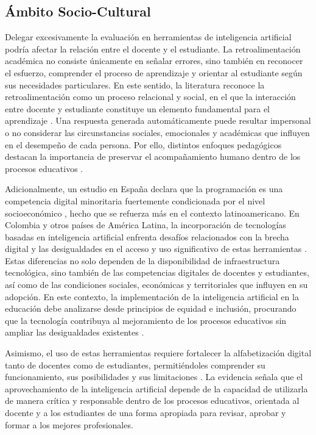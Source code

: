 \documentclass[letterpaper, 10 pt, conference]{ieeeconf}
\begin{document}
\subsection{Ámbito Socio-Cultural} 

Delegar excesivamente la evaluación en herramientas de inteligencia artificial podría afectar la relación entre el docente y el estudiante. La retroalimentación académica no consiste únicamente en señalar errores, sino también en reconocer el esfuerzo, comprender el proceso de aprendizaje y orientar al estudiante según sus necesidades particulares. En este sentido, la literatura reconoce la retroalimentación como un proceso relacional y social, en el que la interacción entre docente y estudiante constituye un elemento fundamental para el aprendizaje \cite{5}. Una respuesta generada automáticamente puede resultar impersonal o no considerar las circunstancias sociales, emocionales y académicas que influyen en el desempeño de cada persona. Por ello, distintos enfoques pedagógicos destacan la importancia de preservar el acompañamiento humano dentro de los procesos educativos \cite{14}. 

Adicionalmente, un estudio en España declara que la programación es una competencia digital minoritaria fuertemente condicionada por el nivel socioeconómico \cite{19}, hecho que se refuerza más en el contexto latinoamericano. En Colombia y otros países de América Latina, la incorporación de tecnologías basadas en inteligencia artificial enfrenta desafíos relacionados con la brecha digital y las desigualdades en el acceso y uso significativo de estas herramientas \cite{17}. Estas diferencias no solo dependen de la disponibilidad de infraestructura tecnológica, sino también de las competencias digitales de docentes y estudiantes, así como de las condiciones sociales, económicas y territoriales que influyen en su adopción. En este contexto, la implementación de la inteligencia artificial en la educación debe analizarse desde principios de equidad e inclusión, procurando que la tecnología contribuya al mejoramiento de los procesos educativos sin ampliar las desigualdades existentes \cite{16}.

Asimismo, el uso de estas herramientas requiere fortalecer la alfabetización digital tanto de docentes como de estudiantes, permitiéndoles comprender su funcionamiento, sus posibilidades y sus limitaciones \cite{17}. La evidencia señala que el aprovechamiento de la inteligencia artificial depende de la capacidad de utilizarla de manera crítica y responsable dentro de los procesos educativos, orientada al docente y a los estudiantes de una forma apropiada para revisar, aprobar y formar a los mejores profesionales. 
\end{document}
